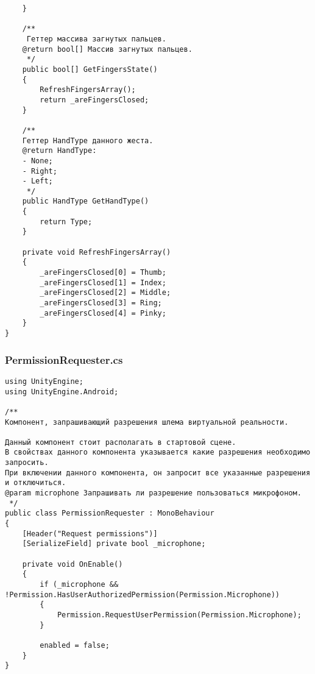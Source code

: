\begin{verbatim}
    }

    /**
     Геттер массива загнутых пальцев.
    @return bool[] Массив загнутых пальцев.
     */
    public bool[] GetFingersState()
    {
        RefreshFingersArray();
        return _areFingersClosed;
    }

    /** 
    Геттер HandType данного жеста.
    @return HandType:
    - None;
    - Right;
    - Left;
     */
    public HandType GetHandType()
    {
        return Type;
    }

    private void RefreshFingersArray()
    {
        _areFingersClosed[0] = Thumb;
        _areFingersClosed[1] = Index;
        _areFingersClosed[2] = Middle;
        _areFingersClosed[3] = Ring;
        _areFingersClosed[4] = Pinky;
    }
}

\end{verbatim}
\subsubsection*{PermissionRequester.cs}
\begin{verbatim}
﻿using UnityEngine;
using UnityEngine.Android;

/**
Компонент, запрашивающий разрешения шлема виртуальной реальности.

Данный компонент стоит располагать в стартовой сцене. 
В свойствах данного компонента указывается какие разрешения необходимо запросить.
При включении данного компонента, он запросит все указанные разрешения и отключиться.
@param microphone Запрашивать ли разрешение пользоваться микрофоном.
 */
public class PermissionRequester : MonoBehaviour
{
    [Header("Request permissions")]
    [SerializeField] private bool _microphone;

    private void OnEnable()
    {
        if (_microphone && !Permission.HasUserAuthorizedPermission(Permission.Microphone))
        {
            Permission.RequestUserPermission(Permission.Microphone);
        }

        enabled = false;
    }
}

\end{verbatim}
